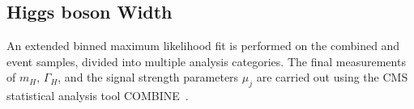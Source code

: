 \subsection{Higgs boson Width} \label{sec:offshellwidth}




An extended binned maximum likelihood fit is performed on the combined \onshell and \offshell event samples, divided into multiple analysis categories. The final measurements of $m_H$, $\Gamma_H$, and the signal strength parameters $\mu_{j}$ are carried out using the CMS statistical analysis tool COMBINE~\cite{CMS:2024onh}.

